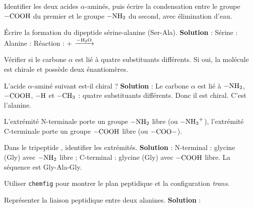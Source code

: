Identifier les deux acides $\alpha$-aminés, puis écrire la condensation entre le groupe $\ce{-COOH}$ du premier et le groupe $\ce{-NH2}$ du second, avec élimination d'eau.

\begin{exemple}
Écrire la formation du dipeptide sérine-alanine (Ser-Ala).
\textbf{Solution} :
Sérine : 
Alanine : 
Réaction :  +  $\xrightarrow{-\ce{H2O}}$ 
\end{exemple}

Vérifier si le carbone $\alpha$ est lié à quatre substituants différents. Si oui, la molécule est chirale et possède deux énantiomères.

\begin{exemple}
L'acide $\alpha$-aminé suivant est-il chiral ? 
\textbf{Solution} : Le carbone $\alpha$ est lié à $\ce{-NH2}$, $\ce{-COOH}$, $\ce{-H}$ et $\ce{-CH3}$ : quatre substituants différents. Donc il est chiral. C'est l'alanine.
\end{exemple}

L'extrémité N-terminale porte un groupe $\ce{-NH2}$ libre (ou $\ce{-NH3+}$), l'extrémité C-terminale porte un groupe $\ce{-COOH}$ libre (ou $\ce{-COO-}$).

\begin{exemple}
Dans le tripeptide , identifier les extrémités.
\textbf{Solution} : N-terminal : glycine (Gly) avec $\ce{-NH2}$ libre ; C-terminal : glycine (Gly) avec $\ce{-COOH}$ libre. La séquence est Gly-Ala-Gly.
\end{exemple}

Utiliser \texttt{chemfig} pour montrer le plan peptidique et la configuration \textit{trans}.

\begin{exemple}
Représenter la liaison peptidique entre deux alanines.
\textbf{Solution} :
\begin{center}
\end{center}
\end{exemple}

